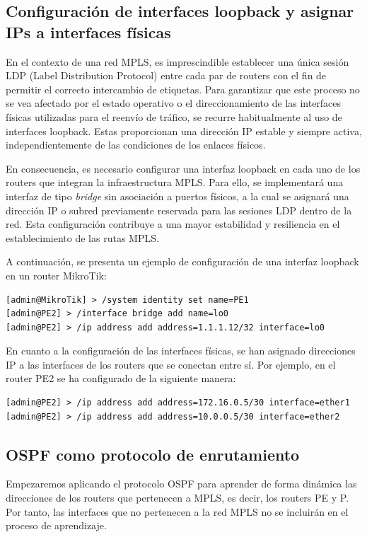 \subsection{Configuración de interfaces loopback y asignar IPs a interfaces físicas}
En el contexto de una red MPLS, es imprescindible establecer una única sesión
LDP (Label Distribution Protocol) entre cada par de routers con el fin de
permitir el correcto intercambio de etiquetas. Para garantizar que este proceso
no se vea afectado por el estado operativo o el direccionamiento de las
interfaces físicas utilizadas para el reenvío de tráfico, se recurre
habitualmente al uso de interfaces loopback. Estas proporcionan una dirección
IP estable y siempre activa, independientemente de las condiciones de los
enlaces físicos.

\vspace{0.5cm}
En consecuencia, es necesario configurar una interfaz
loopback en cada uno de los routers que integran la infraestructura MPLS. Para
ello, se implementará una interfaz de tipo \textit{bridge} sin asociación a puertos
físicos, a la cual se asignará una dirección IP o subred previamente reservada
para las sesiones LDP dentro de la red. Esta configuración contribuye a una
mayor estabilidad y resiliencia en el establecimiento de las rutas MPLS.

\newpage

\vspace{0.5cm}
A continuación, se presenta un ejemplo de configuración de una interfaz
loopback en un router MikroTik:

\begin{lstlisting}[language=RouterOS]
[admin@MikroTik] > /system identity set name=PE1
[admin@PE2] > /interface bridge add name=lo0
[admin@PE2] > /ip address add address=1.1.1.12/32 interface=lo0
\end{lstlisting}

En cuanto a la configuración de las interfaces físicas, se han asignado
direcciones IP a las interfaces de los routers que se conectan entre sí. Por
ejemplo, en el router PE2 se ha configurado de la siguiente manera:

\begin{lstlisting}[language=RouterOS]
[admin@PE2] > /ip address add address=172.16.0.5/30 interface=ether1
[admin@PE2] > /ip address add address=10.0.0.5/30 interface=ether2
\end{lstlisting}

\subsection{OSPF como protocolo de enrutamiento}
Empezaremos aplicando el protocolo OSPF para aprender de forma dinámica las
direcciones de los routers que pertenecen a MPLS, es decir, los routers PE y P.
Por tanto, las interfaces que no pertenecen a la red MPLS no se incluirán en el
proceso de aprendizaje.


